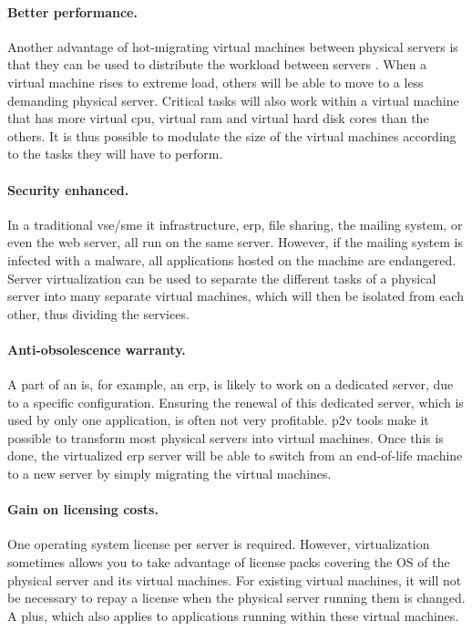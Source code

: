 \paragraph{Better performance.} Another advantage of hot-migrating virtual machines between physical servers is that they can be used to distribute the workload between servers \citep{livemigration,livemigration2}. When a virtual machine rises to extreme load, others will be able to move to a less demanding physical server. Critical tasks will also work within a virtual machine that has more virtual \acrshort{cpu}, virtual \acrshort{ram} and virtual hard disk cores than the others. It is thus possible to modulate the size of the virtual machines according to the tasks they will have to perform.

\paragraph{Security enhanced.} In a traditional \acrshort{vse}/\acrshort{sme} \acrshort{it} infrastructure, \acrshort{erp}, file sharing, the mailing system, or even the web server, all run on the same server. However, if the mailing system is infected with a malware, all applications hosted on the machine are endangered. Server virtualization can be used to separate the different tasks of a physical server into many separate virtual machines, which will then be isolated from each other, thus dividing the services.

\paragraph{Anti-obsolescence warranty.} A part of an \acrshort{is}, for example, an \acrshort{erp}, is likely to work on a dedicated server, due to a specific configuration. Ensuring the renewal of this dedicated server, which is used by only one application, is often not very profitable. \acrshort{p2v} tools make it possible to transform most physical servers into virtual machines. Once this is done, the virtualized \acrshort{erp} server will be able to switch from an end-of-life machine to a new server by simply migrating the virtual machines.

\paragraph{Gain on licensing costs.} One operating system license per server is required. However, virtualization sometimes allows you to take advantage of license packs covering the OS of the physical server and its virtual machines. For existing virtual machines, it will not be necessary to repay a license when the physical server running them is changed. A plus, which also applies to applications running within these virtual machines.

